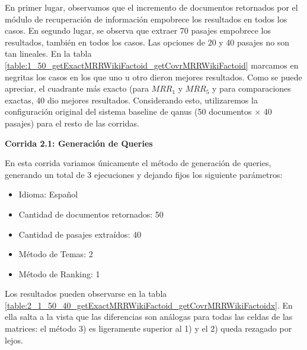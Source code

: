 En primer lugar, observamos que el incremento de documentos retornados por el módulo de recuperación de información empobrece los resultados en todos los casos.
En segundo lugar, se observa que extraer 70 pasajes empobrece los resultados, también en todos los casos. Las opciones de 20 y 40 pasajes no son tan lineales. En la tabla \ref{table:1_50_getExactMRRWikiFactoid_getCovrMRRWikiFactoid} marcamos en negritas los casos en los que uno u otro dieron mejores resultados. Como se puede apreciar, el cuadrante más exacto (para $MRR_{1}$ y $MRR_{5}$ y para comparaciones exactas, 40 dio mejores resultados. Considerando esto, utilizaremos la configuración original del sistema baseline de qanus (50 documentos $\times$ 40 pasajes) para el resto de las corridas. \newline


\textbf{Corrida 2.1: Generación de Queries}\newline

En esta corrida variamos únicamente el método de generación de queries, generando un total de 3 ejecuciones y dejando fijos los siguiente parámetros: \newline

\begin{itemize}
  \item Idioma: Español
  \item Cantidad de documentos retornados: 50
  \item Cantidad de pasajes extraídos: 40
  \item Método de Temas: 2
  \item Método de Ranking: 1
\end{itemize}

Los resultados pueden observarse en la tabla \ref{table:2_1_50_40_getExactMRRWikiFactoid_getCovrMRRWikiFactoidx}. En ella salta a la vista que las diferencias son análogas para todas las celdas de las matrices: el método 3) es ligeramente superior al 1) y el 2) queda rezagado por lejos.


